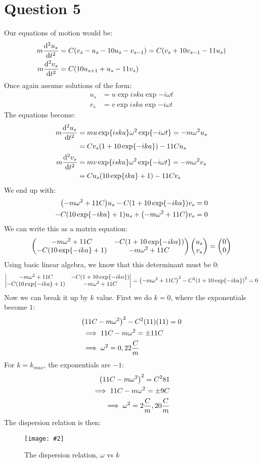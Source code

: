 \documentclass[12pt]{article}
\newcommand{\fig}[3]
{
  \begin{figure}[H]
    \centering
    \texttt{[image: \#2]}
    \caption{#3}
  \end{figure}
}
\begin{document}
\section*{Question 5}
Our equations of motion would be:
\begin{align*}
  m\dv[2]{u_s}{t}&=C\qty(v_s-u_s-10u_s-v_{s-1})=C\qty(v_s+10v_{s-1}-11u_s)\\
  m\dv[2]{v_s}{t}&=C\qty(10u_{s+1}+u_s-11v_s)
\end{align*}
Once again assume solutions of the form:
\begin{align*}
  u_s&=u\exp{iska}\exp{-i\omega t}\\
  v_s&=v\exp{iska}\exp{-i\omega t}
\end{align*}
The equations become:
\begin{align*}
  m\dv[2]{u_s}{t}&=mu\exp{iska}\omega^2\exp{-i\omega t}=-m\omega^2u_s\\
  &=Cv_s\qty(1+10\exp{-ika})-11Cu_s\\
  m\dv[2]{v_s}{t}&=mv\exp{iska}\omega^2\exp{-i\omega t}=-m\omega^2v_s\\
  &=Cu_s\qty(10\exp{ika}+1)-11Cv_s
\end{align*}
We end up with:
\begin{align*}
  \qty(-m\omega^2+11C)u_s-C\qty(1+10\exp{-ika})v_s&=0\\
  -C\qty(10\exp{-ika}+1)u_s+\qty(-m\omega^2+11C)v_s&=0
\end{align*}
We can write this as a matrix equation:
\begin{align*}
  \pmqty{-m\omega^2+11C&-C\qty(1+10\exp{-ika})\\
    -C\qty(10\exp{-ika}+1)&-m\omega^2+11C}
  \pmqty{u_s\\v_s}=\pmqty{0\\0}
\end{align*}
Using basic linear algebra, we know that this determinant must be 0:
\begin{align*}
  \vmqty{-m\omega^2+11C&-C\qty(1+10\exp{-ika})\\
    -C\qty(10\exp{-ika}+1)&-m\omega^2+11C}=\qty(-m\omega^2+11C)^2
  -C^2\qty(1+10\exp{-ika})^2=0
\end{align*}
Now we can break it up by $k$ value. First we do $k=0$, where the exponentials become $1$:
\begin{align*}
  &\qty(11C-m\omega^2)^2-C^2(11)(11)=0\\
  &\implies11C-m\omega^2=\pm 11C\\
  &\implies \omega^2=0,22\frac{C}{m}
\end{align*}
For $k=k_{max}$, the exponentials are $-1$:
\begin{align*}
  \qty(11C-m\omega^2)^2=C^281\\
  \implies 11C-m\omega^2=\pm 9C\\
  \implies \omega^2=2\frac{C}{m},20\frac{C}{m}
\end{align*}
The dispersion relation is then:
\fig{10.0}{hw4disp}{The dispersion relation, $\omega$ vs $k$}
\end{document}
